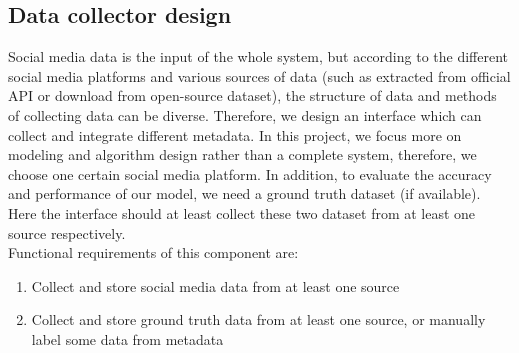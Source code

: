 \subsection{Data collector design}
\label{sec:Data collector design}
Social media data is the input of the whole system, but according to the different social media platforms and various sources of data (such as extracted from official API or download from open-source dataset), the structure of data and methods of collecting data can be diverse. Therefore, we design an interface which can collect and integrate different metadata. In this project, we focus more on modeling and algorithm design rather than a complete system, therefore, we choose one certain social media platform. In addition, to evaluate the accuracy and performance of our model, we need a ground truth dataset (if available). Here the interface should at least collect these two dataset from at least one source respectively.\\
Functional requirements of this component are:
\begin{enumerate}
    \item Collect and store social media data from at least one source
    \item Collect and store ground truth data from at least one source, or manually label some data from metadata
\end{enumerate}
